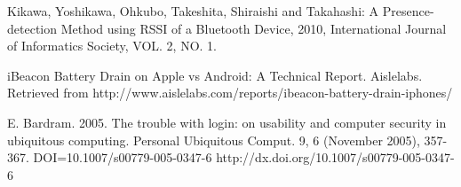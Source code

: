 
%
%
%
\begin{thebibliography}{1}

 Kikawa, Yoshikawa, Ohkubo, Takeshita, Shiraishi and Takahashi:  
 A Presence-detection Method using RSSI of a Bluetooth Device, 2010, International Journal of Informatics Society, VOL. 2, NO. 1. 


iBeacon Battery Drain on Apple vs Android: A Technical Report. Aislelabs. Retrieved from http://www.aislelabs.com/reports/ibeacon-battery-drain-iphones/

E. Bardram. 2005. The trouble with login: on usability and computer security in ubiquitous computing. Personal Ubiquitous Comput. 9, 6 (November 2005), 357-367. DOI=10.1007/s00779-005-0347-6 http://dx.doi.org/10.1007/s00779-005-0347-6


\end{thebibliography}
